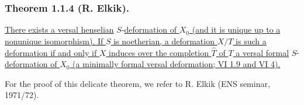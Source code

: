 \subsubsection*{Theorem 1.1.4 (R. Elkik).}
\underline{There exists a versal henselian} $S$-\underline{deformation of $X_0$
(and it is unique up to a nonunique isomorphism).  If $S$ is
noetherian, a deformation $X/T$ is such a deformation if and only if
$X$ induces over the completion $\widehat T$ of $T$ a versal formal}
$S$-\underline{deformation of $X_0$ (a minimally formal versal deformation;
VI 1.9 and VI 4).}

For the proof of this delicate theorem, we refer to R. Elkik
(ENS seminar, 1971/72).

